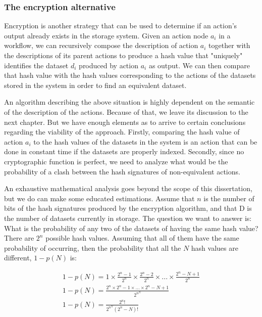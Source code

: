 \subsubsection{The encryption alternative}
\label{sec:encryption}
Encryption is another strategy that can be used to determine if an action's output already exists in the storage system. Given an action node $a_i$ in a workflow, we can recursively compose the description of action $a_i$ together with the descriptions of its parent actions to produce a hash value that "uniquely" identifies the dataset $d_i$ produced by action $a_i$ as output.  We can then compare that hash value with the hash values corresponding to the actions of the datasets stored in the system in order to find an equivalent dataset.

An algorithm describing the above situation is highly dependent on the semantic of the description of the actions.  Because of that, we leave its discussion to the next chapter.  But we have enough elements as to arrive to certain conclusions regarding the viability of the approach.  Firstly, comparing the hash value of action $a_i$ to the hash values of the datasets in the system is an action that can be done in constant time if the datasets are properly indexed.  Secondly, since no cryptographic function is perfect, we need to analyze what would be the probability of a clash between the hash signatures of non-equivalent actions.  

An exhaustive mathematical analysis goes beyond the scope of this dissertation, but we do can make some educated estimations.  Assume that $n$ is the number of bits of the hash signatures produced by the encryption algorithm, and that D is the number of datasets currently in storage.  The question we want to answer is: What is the probability of any two of the datasets of having the same hash value?  There are $2^n$ possible hash values.  Assuming that all of them have the same probability of occurring, then the probability that all the $N$ hash values are different, $1 - p(N)$ is:

\begin{multline}
	1 - p(N) = 1 \times \frac{2^n - 1}{2^n} \times \frac{2^n - 2}{2^n} \times . . . \times \frac{2^n - N + 1}{2^n} \\ 
	1 - p(N) = \frac{2^n \times 2^n - 1 \times . . . \times 2^n - N + 1}{2^{n^{N}}} \\ 
	1 - p(N) = \frac{2^n !}{2^{n{^N}} (2^n - N)!} \\
\end{multline}

